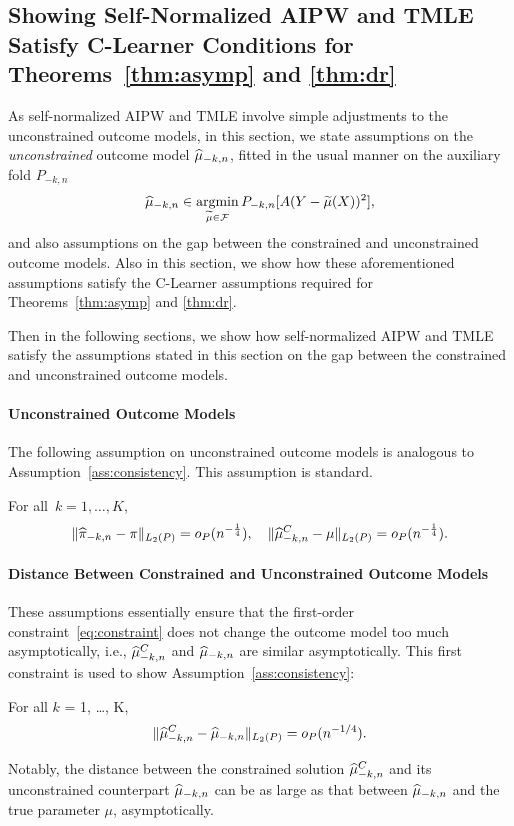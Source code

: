 \subsection{Showing Self-Normalized AIPW and TMLE Satisfy C-Learner Conditions for Theorems~\ref{thm:asymp} and \ref{thm:dr}}
\label{sec:show_for_aipw_tmle}

As self-normalized AIPW and TMLE involve simple adjustments to the unconstrained outcome models, 
in this section, we state assumptions on the \emph{unconstrained} outcome model
$\widehat{\mu}_{-k, n}$, fitted in the usual manner on the auxiliary fold $P_{-k, n}$
\begin{equation*}
  \widehat{\mu}_{-k, n} \in \mathop{\rm argmin}_{\widetilde{\mu} \in \mathcal{F}} 
  P_{-k, n}[ A (Y - \widetilde{\mu}(X))^2],
\end{equation*}
and also assumptions on the gap between the constrained and unconstrained outcome models. Also in this section, we show how these aforementioned assumptions satisfy the C-Learner assumptions required for Theorems~\ref{thm:asymp} and \ref{thm:dr}. 

Then in the following sections, we show how
self-normalized AIPW and TMLE satisfy the assumptions stated in this section on the gap between the constrained and unconstrained outcome models. 
 
\paragraph{Unconstrained Outcome Models}
The following assumption on unconstrained outcome models is analogous to Assumption~\ref{ass:consistency}. This assumption is standard. 
\begin{assumption}
\label{ass:consistency_unconstrained}
For all~$k=1,\ldots,K$,
    $$
    \|\widehat{\pi}_{-k,n} - \pi\|_{L_2(P)}=o_P(n^{-\frac{1}{4}}), \quad  \|\widehat{\mu}_{-k,n}^C - \mu\|_{L_2(P)}=o_P(n^{-\frac{1}{4}}).
    $$
\end{assumption}

\paragraph{Distance Between Constrained and Unconstrained Outcome Models}
These assumptions essentially ensure that the first-order constraint~\eqref{eq:constraint} does not change the outcome model too much asymptotically, i.e., $\widehat{\mu}^C_{-k,n}$ and $\widehat{\mu}_{-k,n}$ are similar asymptotically. 
This first constraint is used to show
Assumption~\ref{ass:consistency}:
\begin{assumption} For all $k$ = 1, \ldots, K,
\label{ass:muC_vs_mu}
$$\|\widehat{\mu}^C_{-k,n}-\widehat{\mu}_{-k,n}\|_{L_2(P)}=o_P(n^{-1/4}).$$
\end{assumption}
Notably, the distance between the constrained solution $\widehat{\mu}^C_{-k,n}$ and its unconstrained counterpart $\widehat{\mu}_{-k,n}$ can be as large as that between $\widehat{\mu}_{-k,n}$ and the true parameter $\mu$, asymptotically.

